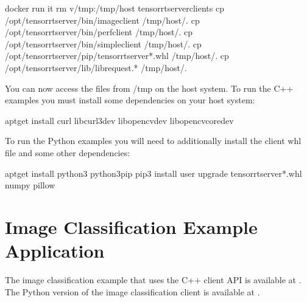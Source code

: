 \documentclass[letterpaper,10pt,english]{sphinxmanual}
\begin{document}
\begin{sphinxVerbatim}[commandchars=\\\{\}]
\PYGZdl{} docker run \PYGZhy{}it \PYGZhy{}\PYGZhy{}rm \PYGZhy{}v/tmp:/tmp/host tensorrtserver\PYGZus{}clients
\PYGZsh{} cp /opt/tensorrtserver/bin/image\PYGZus{}client /tmp/host/.
\PYGZsh{} cp /opt/tensorrtserver/bin/perf\PYGZus{}client /tmp/host/.
\PYGZsh{} cp /opt/tensorrtserver/bin/simple\PYGZus{}client /tmp/host/.
\PYGZsh{} cp /opt/tensorrtserver/pip/tensorrtserver\PYGZhy{}*.whl /tmp/host/.
\PYGZsh{} cp /opt/tensorrtserver/lib/librequest.* /tmp/host/.
\end{sphinxVerbatim}

You can now access the files from /tmp on the host system. To run the
C++ examples you must install some dependencies on your host system:

\begin{sphinxVerbatim}[commandchars=\\\{\}]
\PYGZdl{} apt\PYGZhy{}get install curl libcurl3\PYGZhy{}dev libopencv\PYGZhy{}dev libopencv\PYGZhy{}core\PYGZhy{}dev
\end{sphinxVerbatim}

To run the Python examples you will need to additionally install the
client whl file and some other dependencies:

\begin{sphinxVerbatim}[commandchars=\\\{\}]
\PYGZdl{} apt\PYGZhy{}get install python3 python3\PYGZhy{}pip
\PYGZdl{} pip3 install \PYGZhy{}\PYGZhy{}user \PYGZhy{}\PYGZhy{}upgrade tensorrtserver\PYGZhy{}*.whl numpy pillow
\end{sphinxVerbatim}


\section{Image Classification Example Application}
\label{\detokenize{client:image-classification-example-application}}\label{\detokenize{client:section-image-classification-example}}
The image classification example that uses the C++ client API is
available at . The
Python version of the image classification client is available at
.
\end{document}
